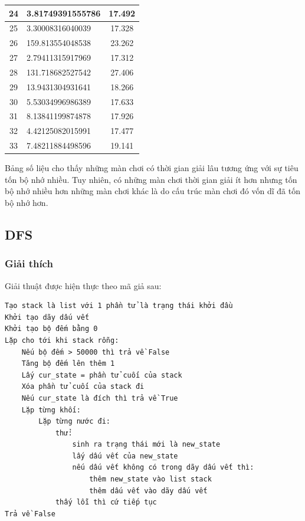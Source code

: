 \documentclass[a4paper, 11pt]{article}
\begin{document}
\begin{center}
\begin{tabular}{|c|l|c|}
		24       & 3.81749391555786  & 17.492       \\ \hline
		25       & 3.30008316040039  & 17.328       \\ \hline
		26       & 159.813554048538  & 23.262       \\ \hline
		27       & 2.79411315917969  & 17.312       \\ \hline
		28       & 131.718682527542  & 27.406       \\ \hline
		29       & 13.9431304931641  & 18.266       \\ \hline
		30       & 5.53034996986389  & 17.633       \\ \hline
		31       & 8.13841199874878  & 17.926       \\ \hline
		32       & 4.42125082015991  & 17.477       \\ \hline
		33       & 7.48211884498596  & 19.141       \\ \hline
    \end{tabular}
\end{center}
Bảng số liệu cho thấy những màn chơi có thời gian giải lâu tương ứng với sự tiêu tốn bộ nhớ nhiều. Tuy 
nhiên, có những màn chơi thời gian giải ít hơn nhưng tốn bộ nhớ nhiều hơn những màn chơi khác 
là do cấu trúc màn chơi đó vốn dĩ đã tốn bộ nhớ hơn.
\subsection{DFS}
\subsubsection{Giải thích}
Giải thuật được hiện thực theo mã giả sau:
\begin{verbatim}
Tạo stack là list với 1 phần tử là trạng thái khởi đầu
Khởi tạo dãy dấu vết
Khởi tạo bộ đếm bằng 0
Lặp cho tới khi stack rỗng:
    Nếu bộ đếm > 50000 thì trả về False
    Tăng bộ đếm lên thêm 1
    Lấy cur_state = phần tử cuối của stack
    Xóa phần tử cuối của stack đi
    Nếu cur_state là đích thì trả về True
    Lặp từng khối:
        Lặp từng nước đi:
            thử:
                sinh ra trạng thái mới là new_state
                lấy dấu vết của new_state
                nếu dấu vết không có trong dãy dấu vết thì:
                    thêm new_state vào list stack
                    thêm dấu vết vào dãy dấu vết
            thấy lỗi thì cứ tiếp tục
Trả về False
\end{verbatim}
\end{document}
